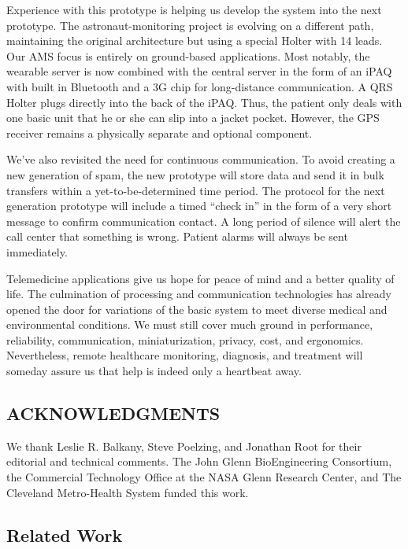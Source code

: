 \documentclass[a4paper,12pt]{article}
\begin{document}
Experience with this prototype is helping us develop the system into the next prototype. The astronaut-monitoring project is evolving on a different path, maintaining the original architecture but using a special Holter with 14 leads. Our AMS focus is entirely on ground-based applications. Most notably, the wearable server is now combined with the central server in the form of an iPAQ with built in Bluetooth and a 3G chip for long-distance communication. A QRS Holter plugs directly into the back of the iPAQ. Thus, the patient only deals with one basic unit that he or she can slip into a jacket pocket. However, the GPS receiver remains a physically separate and optional component.

We’ve also revisited the need for continuous communication. To avoid creating a new generation of spam, the new prototype will store data and send it in bulk transfers within a yet-to-be-determined time period. The protocol for the next generation prototype will include a timed “check in” in the form of a very short message to confirm communication contact. A long period of silence will alert the call center that something is wrong. Patient alarms will always be sent immediately.

Telemedicine applications give us hope for peace of mind and a better quality of life. The culmination of processing and communication technologies has already opened the door for variations of the basic system to meet diverse medical and environmental conditions. We must still cover much ground in performance, reliability, communication, miniaturization, privacy, cost, and ergonomics. Nevertheless, remote healthcare monitoring, diagnosis, and treatment will someday assure us that help is indeed only a heartbeat away.

\subsection{ACKNOWLEDGMENTS}


We thank Leslie R. Balkany, Steve Poelzing, and Jonathan Root for their editorial and technical comments. The John Glenn BioEngineering Consortium, the Commercial Technology Office at the NASA Glenn Research Center, and The Cleveland Metro-Health System funded this work.

\subsection{Related Work}
\end{document}
